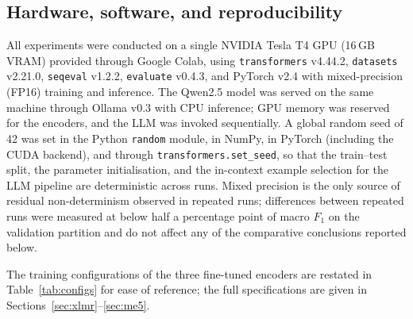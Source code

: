 \subsection{Hardware, software, and reproducibility}
\label{sec:reproducibility}

All experiments were conducted on a single NVIDIA Tesla T4 GPU (16\,GB VRAM) provided through Google Colab, using \texttt{transformers} v4.44.2, \texttt{datasets} v2.21.0, \texttt{seqeval} v1.2.2, \texttt{evaluate} v0.4.3, and PyTorch v2.4 with mixed-precision (FP16) training and inference. The Qwen2.5 model was served on the same machine through Ollama v0.3 with CPU inference; GPU memory was reserved for the encoders, and the LLM was invoked sequentially. A global random seed of 42 was set in the Python \texttt{random} module, in NumPy, in PyTorch (including the CUDA backend), and through \texttt{transformers.set\_seed}, so that the train--test split, the parameter initialisation, and the in-context example selection for the LLM pipeline are deterministic across runs. Mixed precision is the only source of residual non-determinism observed in repeated runs; differences between repeated runs were measured at below half a percentage point of macro $F_1$ on the validation partition and do not affect any of the comparative conclusions reported below.

The training configurations of the three fine-tuned encoders are restated in Table~\ref{tab:configs} for ease of reference; the full specifications are given in Sections~\ref{sec:xlmr}--\ref{sec:me5}.

